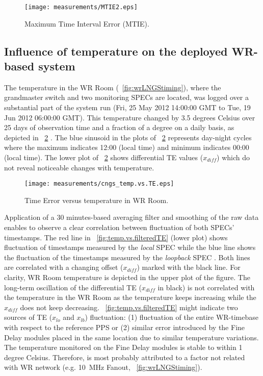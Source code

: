 \begin{figure}[!t]
\centering
\texttt{[image: measurements/MTIE2.eps]}
\caption{Maximum Time Interval Error (MTIE).}
\label{fig:MTIE}
\end{figure}

\subsection{Influence of temperature on the deployed WR-based system}

The temperature in the WR Room (\figurename~\ref{fig:wrLNGStiming}), where the grandmaster
switch and two monitoring SPECs are located, was logged over a substantial
part of the system run (Fri, 25 May 2012 14:00:00 GMT to Tue, 19 Jun 2012 06:00:00 GMT).
This temperature changed by 3.5 degrees Celsius over 25 days of observation time and 
a fraction of a degree on a daily basis, as depicted in \figurename~\ref{fig:temp.vs.TE} 
. 
The blue sinusoid in the plots of \figurename~\ref{fig:temp.vs.TE} represents day-night cycles where the maximum indicates 
12:00 (local time) and minimum indicates 00:00 (local time). The lower plot of \figurename~\ref{fig:temp.vs.TE}
shows differential TE values ($x_{diff}$) which do not reveal noticeable changes with temperature. 

\begin{figure}[!t]
\centering
\texttt{[image: measurements/cngs\_temp.vs.TE.eps]}
\caption{Time Error versus temperature in WR Room.}
\label{fig:temp.vs.TE}
\end{figure}

Application of a 30 minutes-based averaging filter and smoothing of the raw data 
 enables to observe 
a clear correlation between fluctuation of both SPECs' timestamps. The red line in 
\figurename~\ref{fig:temp.vs.filteredTE} (lower plot) shows fluctuation of timestamps measured by the 
\textit{local} SPEC  while the blue line shows the fluctuation of the timestamps measured by the 
\textit{loopback} SPEC . Both lines
are correlated with a changing offset ($x_{diff}$) marked with the black line. For clarity,
WR Room temperature is depicted in the upper plot of the figure. The 
long-term oscillation of the differential TE ($x_{diff}$ in black) is not correlated 
with the temperature in the WR Room as the temperature keeps increasing while the 
$x_{diff}$ does not keep decreasing.
\figurename~\ref{fig:temp.vs.filteredTE} might indicate two sources of TE 
($x_{lo}$ and $x_{lb}$) fluctuation: (1) fluctuation of the entire WR-timebase with respect
to the reference PPS or (2) similar error introduced by the Fine Delay modules placed in the 
same location due to similar temperature variations.
The temperature monitored on the Fine Delay modules is stable to within 1 degree Celsius. Therefore,
 is most probably attributed to a factor not 
related with WR network (e.g. 10~MHz Fanout, \figurename~\ref{fig:wrLNGStiming}).

